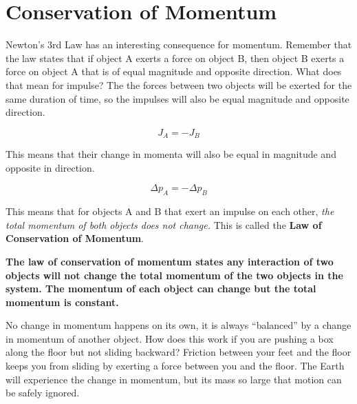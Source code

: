 \documentclass[12pt]{book}
\begin{document}
\section{Conservation of Momentum}

Newton's 3rd Law has an interesting consequence for momentum. Remember that the law states that if object A exerts a force on object B, then object B exerts a force on object A that is of equal magnitude and opposite direction. What does that mean for impulse? The the forces between two objects will be exerted for the same duration of time, so the impulses will also be equal magnitude and opposite direction. 

\begin{equation}
J_A = -J_B
\end{equation}

This means that their change in momenta will also be equal in magnitude and opposite in direction.

\begin{equation}
\Delta p_A = -\Delta p_B
\end{equation}

This means that for objects A and B that exert an impulse on each other, \textit{the total momentum of both objects does not change.} This is called the \textbf{Law of Conservation of Momentum}.

\linespace

\textbf{The law of conservation of momentum states any interaction of two objects will not change the total momentum of the two objects in the system. The momentum of each object can change but the total momentum is constant.}

\linespace

No change in momentum happens on its own, it is always ``balanced'' by a change in momentum of another object. How does this work if you are pushing a box along the floor but not sliding backward? Friction between your feet and the floor keeps you from sliding by exerting a force between you and the floor. The Earth will experience the change in momentum, but its mass so large that motion can be safely ignored.

\pagebreak
\end{document}
